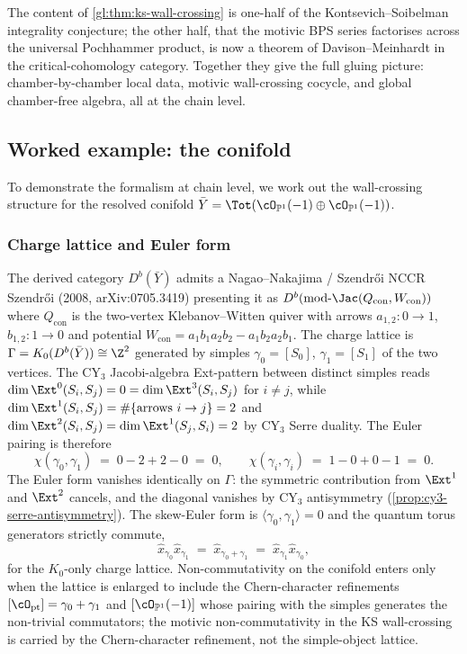 \begin{remark}
 The content of \cref{gl:thm:ks-wall-crossing} is one-half of the
 Kontsevich--Soibelman integrality conjecture; the other half, that the
 motivic BPS series factorises across the universal Pochhammer product,
 is now a theorem of Davison--Meinhardt in the critical-cohomology
 category. Together they give the full gluing picture: chamber-by-chamber
 local data, motivic wall-crossing cocycle, and global chamber-free
 algebra, all at the chain level.
\end{remark}

\subsection{Worked example: the conifold}
\label{sec:wc-conifold}

To demonstrate the formalism at chain level, we work out the wall-crossing
structure for the resolved conifold
$\bar{Y} = \Tot(\cO_{\mathbb P^1}(-1) \oplus \cO_{\mathbb P^1}(-1))$.

\subsubsection{Charge lattice and Euler form}

The derived category $D^b(\bar{Y})$ admits a Nagao--Nakajima / Szendr\H{o}i
NCCR Szendr\H{o}i (2008, arXiv:0705.3419) presenting it as
$D^b(\mathrm{mod}\text{-}\Jac(Q_{\mathrm{con}}, W_{\mathrm{con}}))$ where $Q_{\mathrm{con}}$ is the two-vertex
Klebanov--Witten quiver with arrows $a_{1,2}\colon 0 \to 1$,
$b_{1,2}\colon 1 \to 0$ and potential
$W_{\mathrm{con}} = a_1 b_1 a_2 b_2 - a_1 b_2 a_2 b_1$. The charge lattice is
$\Gamma = K_0(D^b(\bar{Y})) \cong \Z^2$ generated by simples
$\gamma_0 = [S_0]$, $\gamma_1 = [S_1]$ of the two vertices. The CY$_3$
Jacobi-algebra Ext-pattern between distinct simples reads
$\dim \Ext^0(S_i, S_j) = 0 = \dim \Ext^3(S_i, S_j)$ for $i \neq j$, while
$\dim \Ext^1(S_i, S_j) = \#\{\text{arrows } i \to j\} = 2$ and
$\dim \Ext^2(S_i, S_j) = \dim \Ext^1(S_j, S_i) = 2$ by CY$_3$ Serre
duality. The Euler pairing is therefore
\[
 \chi(\gamma_0, \gamma_1) \;=\; 0 - 2 + 2 - 0 \;=\; 0,
 \qquad \chi(\gamma_i, \gamma_i) \;=\; 1 - 0 + 0 - 1 \;=\; 0.
\]
The Euler form vanishes identically on $\Gamma$: the symmetric contribution
from $\Ext^1$ and $\Ext^2$ cancels, and the diagonal vanishes by CY$_3$
antisymmetry (\cref{prop:cy3-serre-antisymmetry}). The skew-Euler form is
$\langle \gamma_0, \gamma_1 \rangle = 0$ and the quantum torus generators
strictly commute,
\[
 \hat{x}_{\gamma_0} \hat{x}_{\gamma_1} \;=\; \hat{x}_{\gamma_0 + \gamma_1}
 \;=\; \hat{x}_{\gamma_1} \hat{x}_{\gamma_0},
\]
for the $K_0$-only charge lattice. Non-commutativity on the conifold enters
only when the lattice is enlarged to include the Chern-character refinements
$[\cO_{\mathrm{pt}}] = \gamma_0 + \gamma_1$ and $[\cO_{\mathbb P^1}(-1)]$
whose pairing with the simples generates the non-trivial commutators; the
motivic non-commutativity in the KS wall-crossing is carried by the
Chern-character refinement, not the simple-object lattice.

